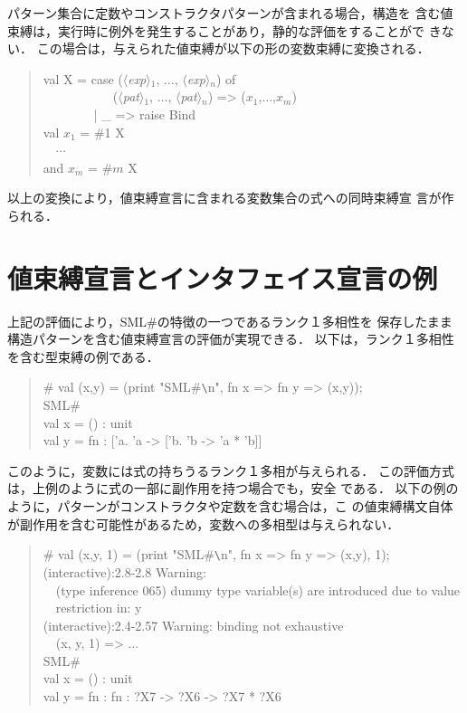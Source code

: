 \documentclass{jbook}
\newif\ifjp
\newcommand{\txt}[2]{#1}
\newcommand{\smlsharp}{SML\#}
\newcommand{\nonterm}[1]{\mbox{$\langle$}{\it #1}\mbox{$\rangle$}}
\newcommand{\myem}{\mbox{\ \ }}
\newenvironment{program}{\begin{quote}\begin{tt}}%
                        {\end{tt}\end{quote}}
\begin{document}
	パターン集合に定数やコンストラクタパターンが含まれる場合，構造を
含む値束縛は，実行時に例外を発生することがあり，静的な評価をすることがで
きない．
	この場合は，与えられた値束縛が以下の形の変数束縛に変換される．
\begin{program}
  val X = case (\nonterm{exp}$_1$, $\ldots$, \nonterm{exp}$_n$) of\\
  \myem\myem\myem\myem\ \ \ (\nonterm{pat}$_1$, $\ldots$, \nonterm{pat}$_n$) => ($x_1$,$\ldots$,$x_m$)\\
  \myem\myem\myem\myem | \_ => raise Bind\\
  val $x_1$ = \#1 X\\
  \myem $\cdots$\\
  and $x_m$ = \#$m$ X
\end{program}

	以上の変換により，値束縛宣言に含まれる変数集合の式への同時束縛宣
言が作られる．

\else%
\fi%

\section{\txt{値束縛宣言とインタフェイス宣言の例}{}}
\label{sec:valuBindings:examples}
\ifjp%

	上記の評価により，\smlsharp{}の特徴の一つであるランク１多相性を
保存したまま構造パターンを含む値束縛宣言の評価が実現できる．
	以下は，ランク１多相性を含む型束縛の例である．
\begin{program}
  \# val (x,y) = (print "SML\#\verb|\|n", fn x => fn y => (x,y));\\
  SML\#\\
  val x = () : unit\\
  val y = fn : ['a. 'a -> ['b. 'b -> 'a * 'b]]
\end{program}
	このように，変数には式の持ちうるランク１多相が与えられる．
	この評価方式は，上例のように式の一部に副作用を持つ場合でも，安全
である．
	以下の例のように，パターンがコンストラクタや定数を含む場合は，こ
の値束縛構文自体が副作用を含む可能性があるため，変数への多相型は与えられない．
\begin{program}
  \# val (x,y, 1) = (print "SML\#\verb|\|n", fn x => fn y => (x,y), 1);\\
  (interactive):2.8-2.8 Warning:\\
  \myem (type inference 065) dummy type variable(s) are introduced due to value\\
  \myem restriction in: y\\
  (interactive):2.4-2.57 Warning: binding not exhaustive\\
  \myem  (x, y, 1) => ...\\
  SML\#\\
  val x = () : unit\\
  val y = fn : fn : ?X7 -> ?X6 -> ?X7 * ?X6
\end{program}
\end{document}
